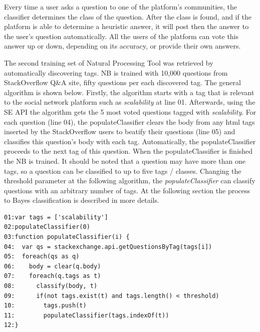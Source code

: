 Every time a user asks a question to one of the platform's communities, the classifier determines the class of the question. After the class is found, and if the platform is able to determine a heuristic answer, it will post then the answer to the user's question automatically. All the users of the platform can vote this answer up or down, depending on its accuracy, or provide their own answers.

The second training set of Natural Processing Tool was retrieved by automatically discovering tags. NB is trained with 10,000 questions from StackOverflow Q\&A site, fifty questions per each discovered tag. The general algorithm is shown below. Firstly, the algorithm starts with a tag that is relevant to the social network platform such as \emph{scalability} at line 01. Afterwards, using the SE API the algorithm gets the 5 most voted questions tagged with \emph{scalability}. For each question (line 04), the populateClassifier clears the body from any html tags inserted by the StackOverflow users to beatify their questions (line 05) and classifies this question's body with each tag. Automatically, the populateClassifier proceeds to the next tag of this question. When the populateClassifier is finished the NB is trained. It should be noted that a question may have more than one tags, so a question can be classified to up to five tags / classes. Changing the threshold parameter at the following algorithm, the \emph{populateClassifier} can classify questions with an arbitrary number of tags. At the following section the process to Bayes classification is described in more details.

\begin{lstlisting} 
01:var tags = ['scalability']
02:populateClassifier(0)
03:function populateClassifier(i) {
04:  var qs = stackexchange.api.getQuestionsByTag(tags[i])
05:  foreach(qs as q)
06:    body = clear(q.body)
07:    foreach(q.tags as t)
08:    	 classify(body, t)
09:    	 if(not tags.exist(t) and tags.length() < threshold)
10:    	   tags.push(t)	  
11:        populateClassifier(tags.indexOf(t))
12:}		
\end{lstlisting}

